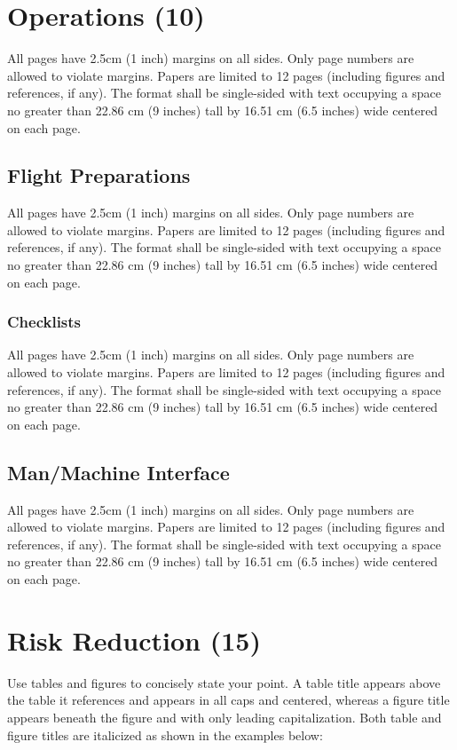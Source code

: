 \documentclass[12pt, letterpaper]{article}
\begin{document}
\section{Operations (10)}
All pages have 2.5cm (1 inch) margins on all sides. Only page numbers are allowed to violate margins. Papers are limited to 12 pages (including figures and references, if any). The format shall be single-sided with text occupying a space no greater than 22.86 cm (9 inches) tall by 16.51 cm (6.5 inches) wide centered on each page.

\subsection{Flight Preparations}
All pages have 2.5cm (1 inch) margins on all sides. Only page numbers are allowed to violate margins. Papers are limited to 12 pages (including figures and references, if any). The format shall be single-sided with text occupying a space no greater than 22.86 cm (9 inches) tall by 16.51 cm (6.5 inches) wide centered on each page.

\subsubsection{Checklists}
All pages have 2.5cm (1 inch) margins on all sides. Only page numbers are allowed to violate margins. Papers are limited to 12 pages (including figures and references, if any). The format shall be single-sided with text occupying a space no greater than 22.86 cm (9 inches) tall by 16.51 cm (6.5 inches) wide centered on each page.

\subsection{Man/Machine Interface}
All pages have 2.5cm (1 inch) margins on all sides. Only page numbers are allowed to violate margins. Papers are limited to 12 pages (including figures and references, if any). The format shall be single-sided with text occupying a space no greater than 22.86 cm (9 inches) tall by 16.51 cm (6.5 inches) wide centered on each page.


\section{Risk Reduction (15)}
Use tables and figures to concisely state your point. A table title appears above the table it references and appears in all caps and centered, whereas a figure title appears beneath the figure and with only leading capitalization. Both table and figure titles are italicized as shown in the examples below:
\end{document}
